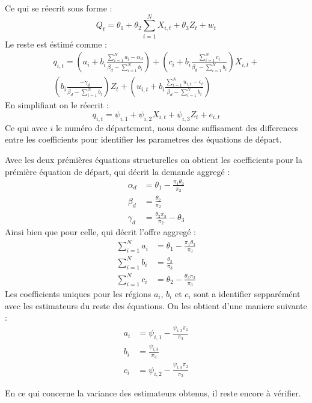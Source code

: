 \documentclass[11pt, a4paper]{article}
\begin{document}
Ce qui se réecrit sous forme :
\begin{equation}
  Q_t = \theta_1 + 
      \theta_2 \sum_{i = 1}^{N} X_{i,t} +
      \theta_3 Z_t + 
      w_t
\end{equation}
Le reste est éstimé comme :
\begin{multline}
  q_{i,t} = (a_i + b_i \frac{\sum_{i = 1}^{N} a_i - \alpha_d}{\beta_d - \sum_{i = 1}^{N} b_i}) + 
      (c_i + b_i \frac{\sum_{i = 1}^{N} c_i}{\beta_d - \sum_{i = 1}^{N} b_i}) X_{i,t} + \\
      (b_i \frac{-\gamma_d}{\beta_d - \sum_{i = 1}^{N} b_i}) Z_t + 
      (u_{i,t} + b_i \frac{\sum_{i = 1}^{N} u_{i,t} - \epsilon_t}{\beta_d - \sum_{i = 1}^{N} b_i})
\end{multline}
En simplifiant on le réecrit : 
\begin{equation}
  q_{i,t} = \psi_{i,1} + 
      \psi_{i,2} X_{i,t} +
      \psi_{i,3} Z_t + 
      e_{i,t}
\end{equation}
Ce qui avec $i$ le numéro de département, nous donne suffisament des differences entre les coefficients pour identifier les parametres des équations de départ. 
\par
Avec les deux prémières équations structurelles on obtient les coefficients pour la prémière équation de départ, qui décrit la demande aggregé :
\begin{align}
  \alpha_d & = \theta_1 - \frac{\pi_1 \theta_2}{\pi_2} \\
  \beta_d & = \frac{\theta_2}{\pi_2} \\
  \gamma_d & = \frac{\theta_2 \pi_3}{\pi_2} - \theta_3
\end{align}
Ainsi bien que pour celle, qui décrit l'offre aggregé :
\begin{align}
  \sum_{i = 1}^{N} a_i & = \theta_1 - \frac{\pi_1 \theta_3}{\pi_3} \\
  \sum_{i = 1}^{N} b_i & = \frac{\theta_3}{\pi_3} \\
  \sum_{i = 1}^{N} c_i & = \theta_2 - \frac{\theta_3 \pi_2}{\pi_3}
\end{align}
Les coefficients uniques pour les régions $a_i$, $b_i$ et $c_i$ sont a identifier sepparémént avec les estimateurs du reste des équations.
On les obtient d'une maniere suivante :
\begin{align}
  a_i & = \psi_{i,1} - \frac{\psi_{i,3} \pi_1}{\pi_3} \\
  b_i & = \frac{\psi_{i,3}}{\pi_3} \\
  c_i & = \psi_{i,2} - \frac{\psi_{i,3} \pi_2}{\pi_3}
\end{align}
\par
En ce qui concerne la variance des estimateurs obtenus, il reste encore à vérifier.
\end{document}
